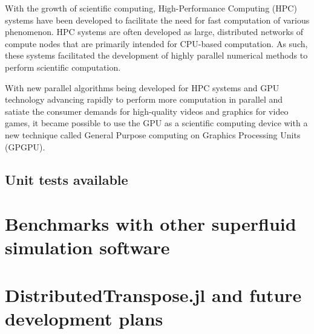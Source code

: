 With the growth of scientific computing, High-Performance Computing (HPC) systems have been developed to facilitate the need for fast computation of various phenomenon.
HPC systems are often developed as large, distributed networks of compute nodes that are primarily intended for CPU-based computation.
As such, these systems facilitated the development of highly parallel numerical methods to perform scientific computation.

With new parallel algorithms being developed for HPC systems and GPU technology advancing rapidly to perform more computation in parallel and satiate the consumer demands for high-quality videos and graphics for video games, it became possible to use the GPU as a scientific computing device with a new technique called General Purpose computing on Graphics Processing Units (GPGPU).

\subsection{Unit tests available}

\section{Benchmarks with other superfluid simulation software}

\section{DistributedTranspose.jl and future development plans}
